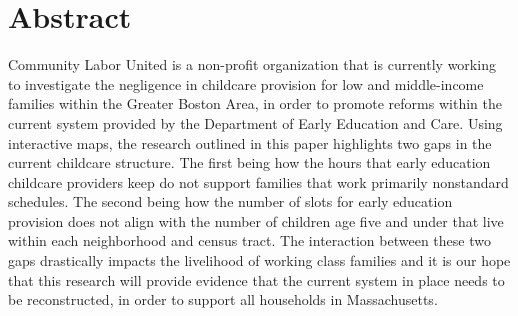 \documentclass[10pt,letterpaper]{article}
\newcommand{\getIndex}[2]{
  \ForEach{,}{\IfEq{#1}{\thislevelitem}{\number\thislevelcount\ExitForEach}{}}{#2}
}
\newcommand{\getAff}[1]{
  \getIndex{#1}{Smith College}
}
\begin{document}
\vspace*{0.2in}

\section*{Abstract}
Community Labor United is a non-profit organization that is currently
working to investigate the negligence in childcare provision for low and
middle-income families within the Greater Boston Area, in order to
promote reforms within the current system provided by the Department of
Early Education and Care. Using interactive maps, the research outlined
in this paper highlights two gaps in the current childcare structure.
The first being how the hours that early education childcare providers
keep do not support families that work primarily nonstandard schedules.
The second being how the number of slots for early education provision
does not align with the number of children age five and under that live
within each neighborhood and census tract. The interaction between these
two gaps drastically impacts the livelihood of working class families
and it is our hope that this research will provide evidence that the
current system in place needs to be reconstructed, in order to support
all households in Massachusetts.

\end{document}
